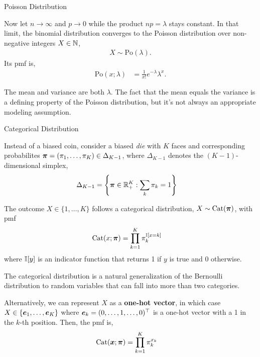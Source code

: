 \documentclass[aspectratio=169]{beamer}
\begin{document}
\begin{frame}[t,allowframebreaks]{Poisson Distribution}\label{poisson-distribution}

Now let \(n \to \infty\) and \(p \to 0\) while the product
\(np = \lambda\) stays constant. In that limit, the binomial distribution converges to
the Poisson distribution over non-negative integers $X \in \mathbb{N}$,
\begin{align*}
X \sim \mathrm{Po}(\lambda).
\end{align*} 
Its pmf is, \begin{align*}
\mathrm{Po}(x; \lambda) &= \frac{1}{x!} e^{-\lambda} \lambda^x.
\end{align*}

The mean and variance are both \(\lambda\). The fact that the mean
equals the variance is a defining property of the Poisson distribution,
but it's not always an appropriate modeling assumption.

\end{frame}

\begin{frame}[t,allowframebreaks]{Categorical Distribution}
\label{categorical-distribution}

Instead of a biased coin, consider a biased \emph{die} with \(K\) faces
and corresponding probabilites
\(\boldsymbol{\pi} = (\pi_1, \ldots, \pi_K) \in \Delta_{K-1}\), where $\Delta_{K-1}$
 denotes the \((K-1)\)-dimensional simplex,
\begin{align*}
\Delta_{K-1} &= \left\{\boldsymbol{\pi} \in \mathbb{R}_+^K: \sum_k \pi_k = 1 \right\}
\end{align*} 

The outcome \(X \in \{1,\ldots,K\}\) follows a categorical distribution, 
$X \sim \mathrm{Cat}(\boldsymbol{\pi})$, with pmf 
\begin{align*}
\mathrm{Cat}(x; \boldsymbol{\pi}) &= \prod_{k=1}^K \pi_k^{\mathbb{I}[x=k]}
\end{align*} 
where \(\mathbb{I}[y]\) is an indicator function that returns 1
if \(y\) is true and 0 otherwise. 

The categorical distribution is a natural generalization of
the Bernoulli distribution to random variables that can fall into more
than two categories.

Alternatively, we can represent \(X\) as a \textbf{one-hot vector}, in
which case \(X \in \{\boldsymbol{e}_1, \ldots, \boldsymbol{e}_K\}\) where
\(\boldsymbol{e}_k = (0, \ldots, 1, \ldots, 0)^\top\) is a one-hot vector with a 1
in the \(k\)-th position. Then, the pmf is, \begin{align*}
\mathrm{Cat}(\boldsymbol{x}; \boldsymbol{\pi}) &= \prod_{k=1}^K \pi_k^{x_k}
\end{align*}

\end{frame}
\end{document}
